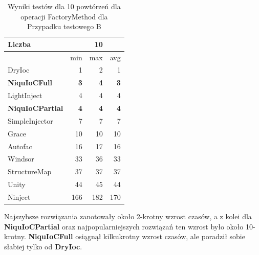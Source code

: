 \documentclass[12pt]{article}
\begin{document}
\begin{table}[H]
\captionsetup{belowskip=0pt,aboveskip=0pt}
\begin{center}
\begin{small}
	\begin{tabular}{ | l | r r r | }
    		\hline
Liczba & & 10 & \\ \hline
 & min & max & avg \\ \hline
DryIoc & 1 & 2 & 1 \\ \hline
\textbf{NiquIoCFull} & \textbf{3} & \textbf{4} & \textbf{3} \\ \hline
LightInject & 4 & 4 & 4 \\ \hline
\textbf{NiquIoCPartial} & \textbf{4} & \textbf{4} & \textbf{4} \\ \hline
SimpleInjector & 7 & 7 & 7 \\ \hline
Grace & 10 & 10 & 10 \\ \hline
Autofac & 16 & 17 & 16 \\ \hline
Windsor & 33 & 36 & 33 \\ \hline
StructureMap & 37 & 37 & 37 \\ \hline
Unity & 44 & 45 & 44 \\ \hline
Ninject & 166 & 182 & 170 \\ \hline
  	\end{tabular}
\end{small}
\end{center}
\caption{Wyniki testów dla 10 powtórzeń dla operacji FactoryMethod dla Przypadku testowego B}
\label{TestCaseB_FactoryMethod10}
\end{table}
Najszybsze rozwiązania zanotowały około 2-krotny wzrost czasów, a z kolei dla \textbf{NiquIoCPartial} oraz najpopularniejszych rozwiązań ten wzrost było około 10-krotny. \textbf{NiquIoCFull} osiągnął kilkukrotny wzrost czasów, ale poradził sobie słabiej tylko od \textbf{DryIoc}.
\\ \\
\end{document}
